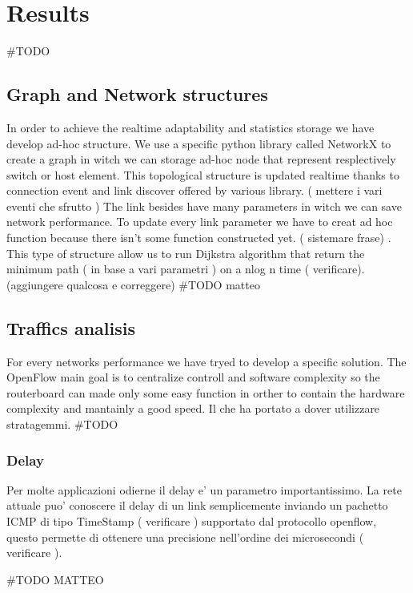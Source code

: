 \documentclass[conference,10pt]{IEEEtran}
\begin{document}

\section{Results}\label{sec:results}
\#TODO %
  \subsection{Graph and Network structures}
  In order to achieve the realtime adaptability and statistics storage we have develop ad-hoc structure.
  We use a specific python library called NetworkX \cite{networkx} to create a graph in witch we can storage ad-hoc node that represent
  resplectively switch or host element.
  This topological structure is updated realtime thanks to connection event and link discover offered by various library.
  ( mettere i vari eventi che sfrutto )
  The link besides have many parameters in witch we can save network performance. To update every link parameter we have to creat ad hoc function
  because there isn't some function constructed yet. ( sistemare frase) .
  This type of structure allow us to run Dijkstra algorithm that return the minimum path ( in base a vari parametri ) on a nlog n time ( verificare).
  (aggiungere qualcosa e correggere)
  \#TODO matteo

  \subsection{Traffics analisis}
  For every networks performance we have tryed to develop a specific solution. The OpenFlow main goal is to centralize controll and software
  complexity so the routerboard can made only some easy function in orther to contain the hardware complexity and mantainly a good speed.
  Il che ha portato a dover utilizzare stratagemmi.
  \#TODO %
    \subsubsection{Delay}
    Per molte applicazioni odierne il delay e' un parametro importantissimo.
    La rete attuale puo' conoscere il delay di un link semplicemente inviando un pachetto ICMP di tipo TimeStamp ( verificare )
    supportato dal protocollo openflow, questo permette di ottenere una precisione nell'ordine dei microsecondi ( verificare ).


    \#TODO MATTEO
\end{document}
